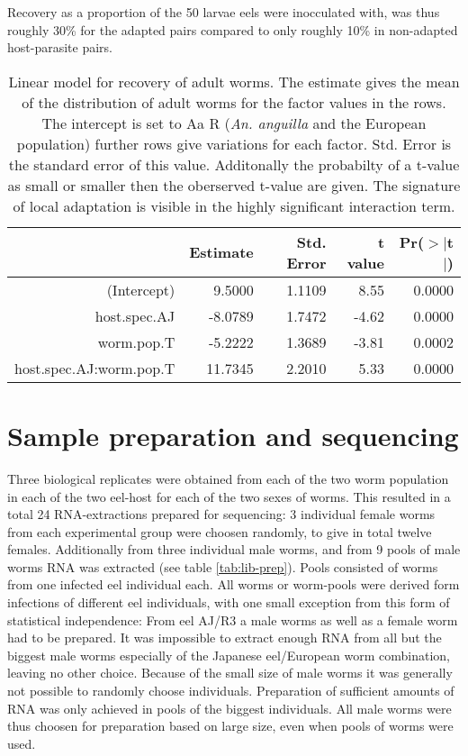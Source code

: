 Recovery as a proportion of the 50 larvae eels were inocculated with,
was thus roughly 30\% for the adapted pairs compared to only roughly
10\% in non-adapted host-parasite pairs.

\begin{table}[ht]
\begin{center}
\begin{tabular}{rrrrr}
  \hline
 & Estimate & Std. Error & t value & Pr($>$$|$t$|$) \\ 
  \hline
  (Intercept) & 9.5000 & 1.1109 & 8.55 & 0.0000 \\ 
  host.spec.AJ & -8.0789 & 1.7472 & -4.62 & 0.0000 \\ 
  worm.pop.T & -5.2222 & 1.3689 & -3.81 & 0.0002 \\ 
  host.spec.AJ:worm.pop.T & 11.7345 & 2.2010 & 5.33 & 0.0000 \\ 
   \hline
\end{tabular}
\caption[Linear model for recovery]{Linear model for recovery of adult
  worms. The estimate gives the mean of the distribution of adult
  worms for the factor values in the rows. The intercept is set to Aa
  R (\textit{An. anguilla} and the European population) further rows
  give variations for each factor. Std. Error is the standard error of
  this value. Additonally the probabilty of a t-value as small or
  smaller then the oberserved t-value are given. The signature of
  local adaptation is visible in the highly significant interaction
  term.}
\label{tab:ad-sig}
\end{center}
\end{table}
\afterpage{\clearpage}

\section{Sample preparation and sequencing }

Three biological replicates were obtained from each of the two worm
population in each of the two eel-host for each of the two sexes of
worms. This resulted in a total 24 RNA-extractions prepared for
sequencing: 3 individual female worms from each experimental group
were choosen randomly, to give in total twelve females. Additionally
from three individual male worms, and from 9 pools of male worms RNA
was extracted (see table \ref{tab:lib-prep}). Pools consisted of worms
from one infected eel individual each. All worms or worm-pools were
derived form infections of different eel individuals, with one small
exception from this form of statistical independence: From eel AJ/R3 a
male worms as well as a female worm had to be prepared. It was
impossible to extract enough RNA from all but the biggest male worms
especially of the Japanese eel/European worm combination, leaving no
other choice. Because of the small size of male worms it was generally
not possible to randomly choose individuals. Preparation of sufficient
amounts of RNA was only achieved in pools of the biggest
individuals. All male worms were thus choosen for preparation based on
large size, even when pools of worms were used.

